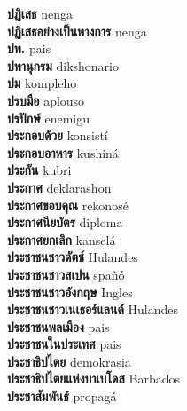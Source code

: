 \textbf{ ปฏิเสธ  } nenga \\
\textbf{ ปฏิเสธอย่างเป็นทางการ  } nenga \\
\textbf{ ปท.  } pais \\
\textbf{ ปทานุกรม  } dikshonario \\
\textbf{ ปม  } kompleho \\
\textbf{ ปรบมือ  } aplouso \\
\textbf{ ปรปักษ์  } enemigu \\
\textbf{ ประกอบด้วย  } konsistí \\
\textbf{ ประกอบอาหาร  } kushiná \\
\textbf{ ประกัน  } kubri \\
\textbf{ ประกาศ  } deklarashon \\
\textbf{ ประกาศขอบคุณ  } rekonosé \\
\textbf{ ประกาศนียบัตร  } diploma \\
\textbf{ ประกาศยกเลิก  } kanselá \\
\textbf{ ประชาชนชาวดัตช์  } Hulandes \\
\textbf{ ประชาชนชาวสเปน  } spañó \\
\textbf{ ประชาชนชาวอังกฤษ  } Ingles \\
\textbf{ ประชาชนชาวเนเธอร์แลนด์  } Hulandes \\
\textbf{ ประชาชนพลเมือง  } pais \\
\textbf{ ประชาชนในประเทศ  } pais \\
\textbf{ ประชาธิปไตย  } demokrasia \\
\textbf{ ประชาธิปไตยแห่งบาเบโดส  } Barbados \\
\textbf{ ประชาสัมพันธ์  } propagá \\
